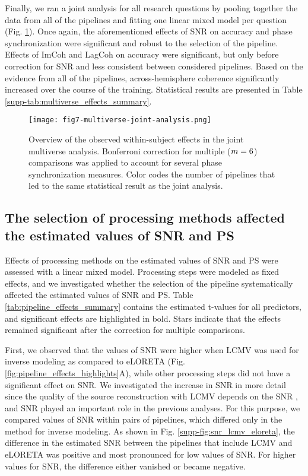 \medskip

Finally, we ran a joint analysis for all research questions by pooling together the data from all of the pipelines and fitting one linear mixed model per question (Fig. \ref{fig:multiverse_joint_analysis}). Once again, the aforementioned effects of SNR on accuracy and phase synchronization were significant and robust to the selection of the pipeline. Effects of ImCoh and LagCoh on accuracy were significant, but only before correction for SNR and less consistent between considered pipelines. Based on the evidence from all of the pipelines, across-hemisphere coherence significantly increased over the course of the training. Statistical results are presented in Table \ref{supp-tab:multiverse_effects_summary}. 

\begin{figure}[htbp]
    \centering
    \texttt{[image: fig7-multiverse-joint-analysis.png]}
    \caption{Overview of the observed within-subject effects in the joint multiverse analysis. Bonferroni correction for multiple ($m=6$) comparisons was applied to account for several phase synchronization measures. Color codes the number of pipelines that led to the same statistical result as the joint analysis.}
    \label{fig:multiverse_joint_analysis}
\end{figure}

\subsection{The selection of processing methods affected the estimated values of SNR and PS}

Effects of processing methods on the estimated values of SNR and PS were assessed with a linear mixed model. Processing steps were modeled as fixed effects, and we investigated whether the selection of the pipeline systematically affected the estimated values of SNR and PS. Table \ref{tab:pipeline_effects_summary} contains the estimated t-values for all predictors, and significant effects are highlighted in bold. Stars indicate that the effects remained significant after the correction for multiple comparisons.

\medskip

First, we observed that the values of SNR were higher when LCMV was used for inverse modeling as compared to eLORETA (Fig. \ref{fig:pipeline_effects_highlights}A), while other processing steps did not have a significant effect on SNR. We investigated the increase in SNR in more detail since the quality of the source reconstruction with LCMV depends on the SNR \citep{LCMV_VanVeen1997}, and SNR played an important role in the previous analyses. For this purpose, we compared values of SNR within pairs of pipelines, which differed only in the method for inverse modeling. As shown in Fig. \ref{supp-fig:snr_lcmv_eloreta}, the difference in the estimated SNR between the pipelines that include LCMV and eLORETA was positive and most pronounced for low values of SNR. For higher values for SNR, the difference either vanished or became negative. 

